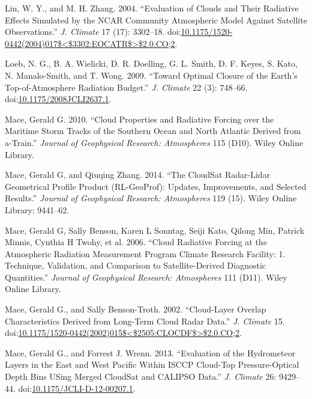 \hypertarget{ref-linux5fandux5fzhangux5f2004}{}
Lin, W. Y., and M. H. Zhang. 2004. ``Evaluation of Clouds and Their
Radiative Effects Simulated by the NCAR Community Atmospheric Model
Against Satellite Observations.'' \emph{J. Climate} 17 (17): 3302--18.
doi:\href{https://doi.org/10.1175/1520-0442(2004)017$\%3C$3302:EOCATR$\%3E$2.0.CO;2}{10.1175/1520-0442(2004)017\$\textless{}\$3302:EOCATR\$\textgreater{}\$2.0.CO;2}.

\hypertarget{ref-loebux5fetux5falux5f2009}{}
Loeb, N. G., B. A. Wielicki, D. R. Doelling, G. L. Smith, D. F. Keyes,
S. Kato, N. Manalo-Smith, and T. Wong. 2009. ``Toward Optimal Closure of
the Earth's Top-of-Atmosphere Radiation Budget.'' \emph{J. Climate} 22
(3): 748--66.
doi:\href{https://doi.org/10.1175/2008JCLI2637.1}{10.1175/2008JCLI2637.1}.

\hypertarget{ref-maceux5f2010}{}
Mace, Gerald G. 2010. ``Cloud Properties and Radiative Forcing over the
Maritime Storm Tracks of the Southern Ocean and North Atlantic Derived
from a-Train.'' \emph{Journal of Geophysical Research: Atmospheres} 115
(D10). Wiley Online Library.

\hypertarget{ref-maceux5fandux5fzhangux5f2014}{}
Mace, Gerald G, and Qiuqing Zhang. 2014. ``The CloudSat Radar-Lidar
Geometrical Profile Product (RL-GeoProf): Updates, Improvements, and
Selected Results.'' \emph{Journal of Geophysical Research: Atmospheres}
119 (15). Wiley Online Library: 9441--62.

\hypertarget{ref-maceux5fetux5falux5f2006}{}
Mace, Gerald G, Sally Benson, Karen L Sonntag, Seiji Kato, Qilong Min,
Patrick Minnis, Cynthia H Twohy, et al. 2006. ``Cloud Radiative Forcing
at the Atmospheric Radiation Measurement Program Climate Research
Facility: 1. Technique, Validation, and Comparison to Satellite-Derived
Diagnostic Quantities.'' \emph{Journal of Geophysical Research:
Atmospheres} 111 (D11). Wiley Online Library.

\hypertarget{ref-maceux5fandux5fbenson-trothux5f2002}{}
Mace, Gerald G., and Sally Benson-Troth. 2002. ``Cloud-Layer Overlap
Characteristics Derived from Long-Term Cloud Radar Data.'' \emph{J.
Climate} 15.
doi:\href{https://doi.org/10.1175/1520-0442(2002)015$\%3C$2505:CLOCDF$\%3E$2.0.CO;2}{10.1175/1520-0442(2002)015\$\textless{}\$2505:CLOCDF\$\textgreater{}\$2.0.CO;2}.

\hypertarget{ref-maceux5fandux5fwrennux5f2013}{}
Mace, Gerald G., and Forrest J. Wrenn. 2013. ``Evaluation of the
Hydrometeor Layers in the East and West Pacific Within ISCCP Cloud-Top
Pressure-Optical Depth Bins USing Merged CloudSat and CALIPSO Data.''
\emph{J. Climate} 26: 9429--44.
doi:\href{https://doi.org/10.1175/JCLI-D-12-00207.1}{10.1175/JCLI-D-12-00207.1}.

